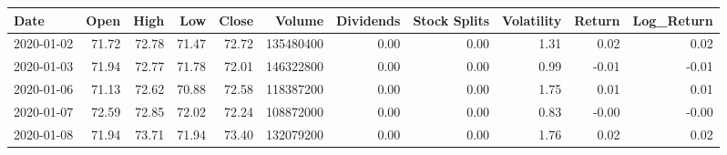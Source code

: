 \begin{tabular}{lrrrrrrrrrr}
\toprule
Date & Open & High & Low & Close & Volume & Dividends & Stock Splits & Volatility & Return & Log_Return \\
\midrule
2020-01-02 & 71.72 & 72.78 & 71.47 & 72.72 & 135480400 & 0.00 & 0.00 & 1.31 & 0.02 & 0.02 \\
2020-01-03 & 71.94 & 72.77 & 71.78 & 72.01 & 146322800 & 0.00 & 0.00 & 0.99 & -0.01 & -0.01 \\
2020-01-06 & 71.13 & 72.62 & 70.88 & 72.58 & 118387200 & 0.00 & 0.00 & 1.75 & 0.01 & 0.01 \\
2020-01-07 & 72.59 & 72.85 & 72.02 & 72.24 & 108872000 & 0.00 & 0.00 & 0.83 & -0.00 & -0.00 \\
2020-01-08 & 71.94 & 73.71 & 71.94 & 73.40 & 132079200 & 0.00 & 0.00 & 1.76 & 0.02 & 0.02 \\
\bottomrule
\end{tabular}
